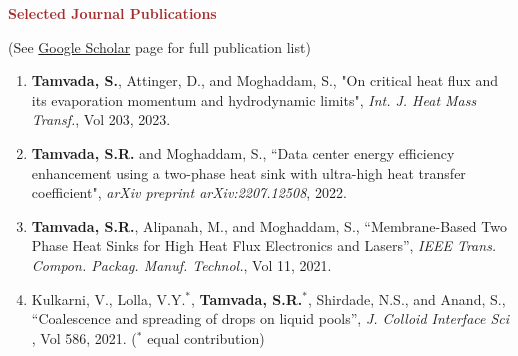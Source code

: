 \documentclass[11pt, letterpaper]{article}
\begin{document}
\noindent \textbf{\large \textcolor{Brown}{Selected Journal Publications}}\hfill \raggedright{(See \href{https://scholar.google.com/citations?user=oQHSsp4AAAAJ&hl=en}{Google Scholar} page for full publication list)}\\
\begin{enumerate}[leftmargin=*]
\setlength\itemsep{-1pt}
\vspace{-8pt}
\item \textbf{Tamvada, S.}, Attinger, D., and Moghaddam, S., "On critical heat flux and its evaporation momentum and hydrodynamic limits", \textit{Int. J. Heat Mass Transf.}, Vol 203, 2023.
\item \textbf{Tamvada, S.R.} and Moghaddam, S., ``Data center energy efficiency enhancement using a two-phase heat sink with ultra-high heat transfer coefficient", \textit{arXiv preprint arXiv:2207.12508}, 2022.
\item \textbf{Tamvada, S.R.}, Alipanah, M., and Moghaddam, S., ``Membrane-Based Two Phase Heat Sinks for High Heat Flux Electronics and Lasers'', \textit{IEEE Trans. Compon. Packag. Manuf. Technol.}, Vol 11, 2021.
\item Kulkarni, V., Lolla, V.Y.$^\ast$, \textbf{Tamvada, S.R.}$^\ast$, Shirdade, N.S., and Anand, S., ``Coalescence and spreading of drops on liquid pools'', \textit{J. Colloid Interface Sci }, Vol 586, 2021. ($^\ast$ equal contribution)
\end{enumerate}
\end{document}
